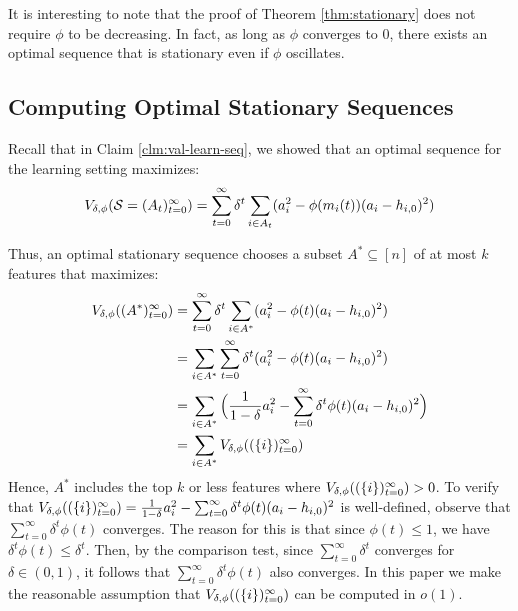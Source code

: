 {It is interesting to note that the proof of Theorem \ref{thm:stationary} does not require $\phi$ to be decreasing. In fact, as long as $\phi$ converges to $0$, there exists an optimal sequence that is stationary even if $\phi$ oscillates.}


\subsection{Computing Optimal Stationary Sequences} \label{sec:complexity}
Recall that in Claim \ref{clm:val-learn-seq}, we showed that an optimal sequence for the learning setting maximizes:
\begin{align*}
    V_{\delta,\phi}(\mathcal{S}=(A_t)_{t=0}^\infty) 
= \sum_{t=0}^\infty \delta^t \sum_{i\in A_t} (a_i^2-\phi(m_{i}(t))(a_i-h_{i,0})^2)
\end{align*}

Thus, an optimal stationary sequence chooses a subset $A^* \subseteq[n]$ of at most $k$ features that maximizes:
\begin{align} \label{eq:stationary-i}
V_{\delta,\phi}((A^*)_{t=0}^\infty) &= \sum_{t=0}^\infty \delta^t \sum_{i\in A^*} (a_i^2-\phi(t)(a_i-h_{i,0})^2) \notag\\
&= \sum_{i\in A^*} \sum_{t=0}^\infty \delta^t (a_i^2-\phi(t)(a_i-h_{i,0})^2) \notag \\
&= \sum_{i\in A^*} \Big(\frac{1}{1-\delta}a_i^2 - \sum_{t=0}^\infty \delta^t \phi(t)(a_i-h_{i,0})^2\Big) \\
&=\sum_{i \in A^*} V_{\delta,\phi}((\{i\})_{t=0}^\infty) \notag
\end{align}
Hence, \( A^* \) includes the top \( k \) or less features where \( V_{\delta,\phi}((\{i\})_{t=0}^\infty) > 0 \).  To verify that \( V_{\delta,\phi}((\{i\})_{t=0}^\infty) =\frac{1}{1-\delta} a_i^2 - \sum_{t=0}^\infty \delta^t \phi(t)(a_i-h_{i,0})^2 \) is well-defined, observe that \( \sum_{t=0}^\infty \delta^t \phi(t) \) converges. The reason for this is that since \( \phi(t) \leq 1 \), we have \( \delta^t\phi(t) \leq \delta^t \). Then, by the comparison test, since \( \sum_{t=0}^\infty \delta^t \) converges for $\delta\in (0,1)$, it follows that \( \sum_{t=0}^\infty \delta^t \phi(t) \) also converges. 
In this paper we make the reasonable assumption that $V_{\delta,\phi}((\{i\})_{t=0}^\infty)$  can be computed in $o(1)$.

